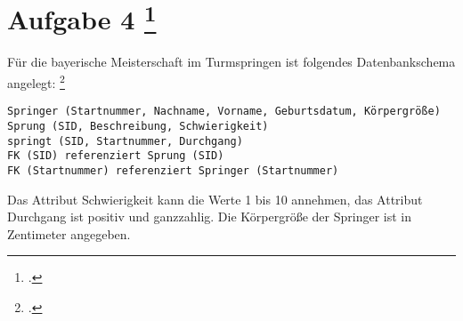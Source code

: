 \documentclass{lehramt-informatik-aufgabe}
\begin{document}
\section{Aufgabe 4
\footcite[Thema 2 Teilaufgabe 2 Aufgabe 4]{examen:46116:2017:09}}

\noindent
Für die bayerische Meisterschaft im Turmspringen ist folgendes
Datenbankschema angelegt:
\footcite[SQL-Anfragen auf mehreren Tabellen]{db:ab:2}

\begin{verbatim}
Springer (Startnummer, Nachname, Vorname, Geburtsdatum, Körpergröße)
Sprung (SID, Beschreibung, Schwierigkeit)
springt (SID, Startnummer, Durchgang)
FK (SID) referenziert Sprung (SID)
FK (Startnummer) referenziert Springer (Startnummer)
\end{verbatim}

\noindent
Das Attribut Schwierigkeit kann die Werte 1 bis 10 annehmen, das
Attribut Durchgang ist positiv und ganzzahlig. Die Körpergröße der
Springer ist in Zentimeter angegeben.
\end{document}
